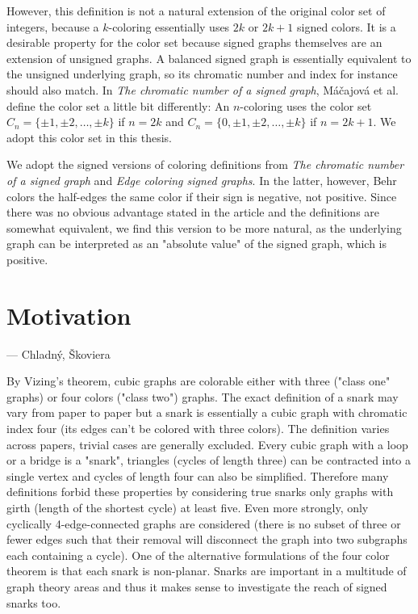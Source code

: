 However, this definition is not a natural extension of the original color set of integers, because a $k$-coloring essentially uses $2k$ or $2k+1$ signed colors. It is a desirable property for the color set because signed graphs themselves are an extension of unsigned graphs. A balanced signed graph is essentially equivalent to the unsigned underlying graph, so its chromatic number and index for instance should also match. In \textit{The chromatic number of a signed graph}, Máčajová et al. define the color set a little bit differently: An $n$-coloring uses the color set $C_n = \{\pm 1,\pm 2,\dots,\pm k\}$ if $n = 2k$ and $C_n = \{0, \pm 1,\pm 2,\dots,\pm k\}$ if $n = 2k + 1$. We adopt this color set in this thesis.

We adopt the signed versions of coloring definitions from \textit{The chromatic number of a signed graph}\cite{chromatic-number} and \textit{Edge coloring signed graphs}\cite{behr-edge-coloring}. In the latter, however, Behr colors the half-edges the same color if their sign is negative, not positive. Since there was no obvious advantage stated in the article and the definitions are somewhat equivalent, we find this version to be more natural, as the underlying graph can be interpreted as an "absolute value" of the signed graph, which is positive.

\section{Motivation}

 --- Chladný, Škoviera \cite{skoviera-citat}

By Vizing's theorem, cubic graphs are colorable either with three ("class one" graphs) or four colors ("class two") graphs. The exact definition of a snark may vary from paper to paper but a snark is essentially a cubic graph with chromatic index four (its edges can't be colored with three colors). The definition varies across papers, trivial cases are generally excluded. Every cubic graph with a loop or a bridge is a "snark", triangles (cycles of length three) can be contracted into a single vertex and cycles of length four can also be simplified. Therefore many definitions forbid these properties by considering true snarks only graphs with girth (length of the shortest cycle) at least five. Even more strongly, only cyclically 4-edge-connected graphs are considered (there is no subset of three or fewer edges such that their removal will disconnect the graph into two subgraphs each containing a cycle). One of the alternative formulations of the four color theorem is that each snark is non-planar. Snarks are important in a multitude of graph theory areas and thus it makes sense to investigate the reach of signed snarks too.

